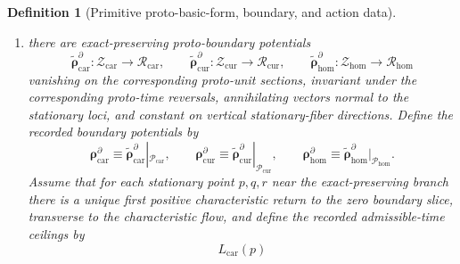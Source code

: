 \documentclass[11pt]{article}
\newcommand{\HomDensityClass}{\mathscr N_{\mathrm{hom}}}
\newcommand{\TensorFluxClass}{\mathscr J_{\mathrm{car}}}
\newcommand{\CurFluxClass}{\mathscr J_{\mathrm{cur}}}
\newcommand{\HomFluxClass}{\mathscr J_{\mathrm{hom}}}
\newcommand{\TensorPhaseReadClass}{\mathscr R_{\mathrm{car}}}
\newcommand{\CurPhaseReadClass}{\mathscr R_{\mathrm{cur}}}
\newcommand{\HomPhaseReadClass}{\mathscr R_{\mathrm{hom}}}
\newcommand{\TensorProcSpace}{\mathcal P_{\mathrm{car}}}
\newcommand{\CurProcSpace}{\mathcal P_{\mathrm{cur}}}
\newcommand{\HomProcSpace}{\mathcal P_{\mathrm{hom}}}
\newcommand{\TensorProcLength}{L_{\mathrm{car}}}
\newcommand{\TensorDensitySource}{\boldsymbol{q}_{\mathrm{car}}}
\newcommand{\CurDensitySource}{\boldsymbol{q}_{\mathrm{cur}}}
\newcommand{\HomDensitySource}{\boldsymbol{q}_{\mathrm{hom}}}
\newcommand{\TensorFluxSource}{\boldsymbol{j}_{\mathrm{car}}}
\newcommand{\CurFluxSource}{\boldsymbol{j}_{\mathrm{cur}}}
\newcommand{\HomFluxSource}{\boldsymbol{j}_{\mathrm{hom}}}
\newcommand{\TensorBoundarySource}{\boldsymbol{\rho}_{\mathrm{car}}^{\partial}}
\newcommand{\CurBoundarySource}{\boldsymbol{\rho}_{\mathrm{cur}}^{\partial}}
\newcommand{\HomBoundarySource}{\boldsymbol{\rho}_{\mathrm{hom}}^{\partial}}
\newcommand{\TensorProtoSpace}{\mathcal Z_{\mathrm{car}}}
\newcommand{\CurProtoSpace}{\mathcal Z_{\mathrm{cur}}}
\newcommand{\HomProtoSpace}{\mathcal Z_{\mathrm{hom}}}
\newcommand{\TensorProtoDensitySource}{\widetilde{\boldsymbol q}_{\mathrm{car}}}
\newcommand{\CurProtoDensitySource}{\widetilde{\boldsymbol q}_{\mathrm{cur}}}
\newcommand{\HomProtoDensitySource}{\widetilde{\boldsymbol q}_{\mathrm{hom}}}
\newcommand{\TensorProtoFluxSource}{\widetilde{\boldsymbol j}_{\mathrm{car}}}
\newcommand{\CurProtoFluxSource}{\widetilde{\boldsymbol j}_{\mathrm{cur}}}
\newcommand{\HomProtoFluxSource}{\widetilde{\boldsymbol j}_{\mathrm{hom}}}
\newcommand{\TensorProtoBoundarySource}{\widetilde{\boldsymbol{\rho}}_{\mathrm{car}}^{\partial}}
\newcommand{\CurProtoBoundarySource}{\widetilde{\boldsymbol{\rho}}_{\mathrm{cur}}^{\partial}}
\newcommand{\HomProtoBoundarySource}{\widetilde{\boldsymbol{\rho}}_{\mathrm{hom}}^{\partial}}
\newtheorem{definition}{Definition}
\begin{document}
\begin{definition}[Primitive proto-basic-form, boundary, and action data]
\begin{enumerate}
\[    \HomProtoDensitySource:\HomProtoSpace\to\HomDensityClass,
    \]
    \[
    \TensorProtoFluxSource:\TensorProtoSpace\to\TensorFluxClass,\qquad
    \CurProtoFluxSource:\CurProtoSpace\to\CurFluxClass,\qquad
    \HomProtoFluxSource:\HomProtoSpace\to\HomFluxClass,
    \]
    invariant under the corresponding proto-time reversals, preserved along the corresponding characteristic flows on the stationary loci, and constant on normal stationary leaves and vertical stationary-fiber directions. Define the recorded source fields by restriction:
    \begin{equation}
    \TensorDensitySource\equiv \TensorProtoDensitySource|_{\TensorProcSpace},\qquad
    \CurDensitySource\equiv \CurProtoDensitySource|_{\CurProcSpace},\qquad
    \HomDensitySource\equiv \HomProtoDensitySource|_{\HomProcSpace},
    \label{eq:density_restriction}
    \end{equation}
    \begin{equation}
    \TensorFluxSource\equiv \TensorProtoFluxSource|_{\TensorProcSpace},\qquad
    \CurFluxSource\equiv \CurProtoFluxSource|_{\CurProcSpace},\qquad
    \HomFluxSource\equiv \HomProtoFluxSource|_{\HomProcSpace}.
    \label{eq:flux_restriction}
    \end{equation}
    \item there are exact-preserving proto-boundary potentials
    \[
    \TensorProtoBoundarySource:\TensorProtoSpace\to\TensorPhaseReadClass,\qquad
    \CurProtoBoundarySource:\CurProtoSpace\to\CurPhaseReadClass,\qquad
    \HomProtoBoundarySource:\HomProtoSpace\to\HomPhaseReadClass
    \]
    vanishing on the corresponding proto-unit sections, invariant under the corresponding proto-time reversals, annihilating vectors normal to the stationary loci, and constant on vertical stationary-fiber directions. Define the recorded boundary potentials by
    \begin{equation}
    \TensorBoundarySource\equiv \TensorProtoBoundarySource|_{\TensorProcSpace},\qquad
    \CurBoundarySource\equiv \CurProtoBoundarySource|_{\CurProcSpace},\qquad
    \HomBoundarySource\equiv \HomProtoBoundarySource|_{\HomProcSpace}.
    \label{eq:boundary_restriction}
    \end{equation}
    Assume that for each stationary point \(p,q,r\) near the exact-preserving branch there is a unique first positive characteristic return to the zero boundary slice, transverse to the characteristic flow, and define the recorded admissible-time ceilings by
    \begin{equation}
    \TensorProcLength(p)

\end{equation}
\end{enumerate}
\end{definition}
\end{document}
